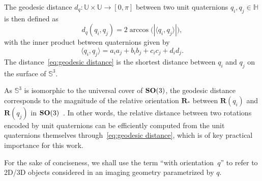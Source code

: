 The geodesic distance $d_q:\mathbb{U}\times\mathbb{U}\rightarrow [0,\pi]$ between two unit quaternions $q_i, q_j\in\mathbb{H}$ is then defined as
\begin{equation}
    \label{eq:geodesic distance}
    d_q(q_i,q_j)=2\arccos\big(|\langle q_i, q_j \rangle|\big),
\end{equation}
with the inner product between quaternions given by
\begin{equation}
    \label{eq:inner-product-quaternions}
    \langle q_i, q_j \rangle = a_ia_j+b_ib_j+c_ic_j+d_id_j.
\end{equation}
The distance~\eqref{eq:geodesic distance} is the shortest distance between $q_i$ and $q_j$ on the surface of $\mathbb{S}^3$.

As $\mathbb{S}^3$ is isomorphic to the universal cover of $\mathrm{\mathbf{SO}}(3)$, the geodesic distance corresponds to the magnitude of the relative orientation $\mathbf{R}_*$ between $\mathbf{R}(q_i)$ and $\mathbf{R}(q_j)$ in $\mathrm{\mathbf{SO}}(3)$~\cite{huynh2009metrics}. In other words, the relative distance between two rotations encoded by unit quaternions can be efficiently computed from the unit quaternions themselves through~\eqref{eq:geodesic distance}, which is of key practical importance for this work.

For the sake of conciseness, we shall use the term ``with orientation~$q$'' to refer to 2D/3D objects considered in an imaging geometry parametrized by $q$.
